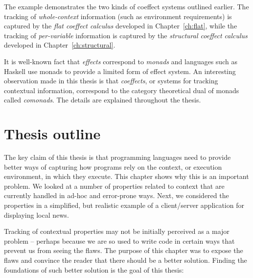 The example demonstrates the two kinds of coeffect systems outlined earlier. The tracking of
\emph{whole-context} information (such as environment requirements) is captured by the \emph{flat
coeffect calculus} developed in Chapter~\ref{ch:flat}, while the tracking of \emph{per-variable}
information is captured by the \emph{structural coeffect calculus} developed in Chapter~\ref{ch:structural}.

It is well-known fact that \emph{effects} correspond to \emph{monads} and languages such as Haskell
use monads to provide a limited form of effect system. An interesting observation made in this thesis
is that \emph{coeffects}, or systems for tracking contextual information, correspond to the category
theoretical dual of monads called \emph{comonads}. The details are explained throughout the thesis.

%
%

\section{Thesis outline}

The key claim of this thesis is that programming languages need to provide better ways of capturing
how programs rely on the context, or execution environment, in which they execute. This chapter
shows why this is an important problem. We looked at a number of properties related to context that
are currently handled in ad-hoc and error-prone ways. Next, we considered the properties in a
simplified, but realistic example of a client/server application for displaying local news.

Tracking of contextual properties may not be initially perceived as a major problem -- perhaps
because we are so used to write code in certain ways that prevent us from seeing the flaws. The
purpose of this chapter was to expose the flaws and convince the reader that there should be a
better solution. Finding the foundations of such better solution is the goal of this thesis:


